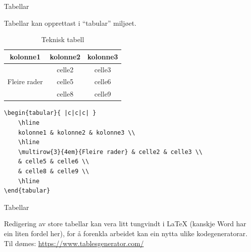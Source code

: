 \begin{frame}[containsverbatim]{Tabellar}
	
	Tabellar kan opprettast i ``tabular'' miljøet.
	
	\begin{table}
		\caption{Teknisk tabell}
		\begin{tabular}{ |c|c|c| } 
			\hline
			kolonne1 & kolonne2 & kolonne3 \\
			\hline
			\multirow{3}{4em}{Fleire rader} & celle2 & celle3 \\ 
			& celle5 & celle6 \\ 
			& celle8 & celle9 \\ 
			\hline
		\end{tabular}
	\end{table}
	
	\begin{verbatim}
\begin{tabular}{ |c|c|c| } 
	\hline
	kolonne1 & kolonne2 & kolonne3 \\
	\hline
	\multirow{3}{4em}{Fleire rader} & celle2 & celle3 \\ 
	& celle5 & celle6 \\ 
	& celle8 & celle9 \\ 
	\hline
\end{tabular}
	\end{verbatim}
	
\end{frame}


\begin{frame}{Tabellar}

  Redigering av store tabellar kan vera litt tungvindt i \LaTeX{} (kanskje Word har ein liten fordel her), for å forenkla arbeidet kan ein nytta ulike kodegeneratorar. Til dømes:
  \href{https://www.tablesgenerator.com/}{https://www.tablesgenerator.com/}
  
\end{frame}

%	
%	


